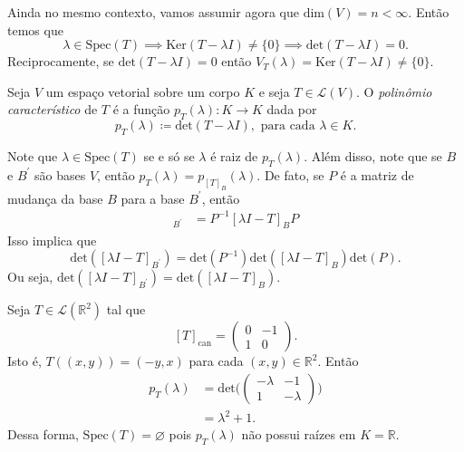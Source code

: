 \documentclass[11pt,twoside,a4paper]{book}
\begin{document}
Ainda no mesmo contexto, vamos assumir agora que \(\text{dim}(V)=n<\infty\). Então temos 
que \[\lambda\in\text{Spec}(T)\implies\text{Ker}(T-\lambda I)\not =\{0\}\implies\text{det}(T-\lambda I)=0.\]
Reciprocamente, se \(\text{det}(T-\lambda I)=0\) então \(V_T(\lambda)=\text{Ker}(T-\lambda I)\not=\{0\}\).
\begin{definicao}
Seja \(V\) um espaço vetorial sobre um corpo \(K\) e seja \(T\in\mathcal{L}(V)\). O \emph{ polinômio característico} de \(T\) é a função \(p_T(\lambda)\colon K\to K\) dada por
\[p_T(\lambda)\coloneqq\text{det}(T-\lambda I), \text{ para cada }\lambda\in K.\]
\end{definicao}
Note que \(\lambda\in\text{Spec}(T)\) se e só se \(\lambda\) é raiz de \(p_T(\lambda)\). Além disso, note que se  \(B\) e \(B^\prime\) são bases \(V\), então \(p_T(\lambda)=p_{[T]_B}(\lambda)\). De fato, se \(P\) é a matriz de mudança da base \(B\) para a base \(B^\prime\), então
\begin{align*}
    [\lambda I - T]_{B^\prime}&=P^{-1}[\lambda I - T]_{B}P
\end{align*}
Isso implica que \[\text{det}([\lambda I- T]_{B^\prime})=\text{det}(P^{-1})\text{det}([\lambda I - T]_B)\text{det}(P).\]
Ou seja, \(\text{det}([\lambda I- T]_{B^\prime})=\text{det}([\lambda I - T]_B)\).
\begin{exemplo}
Seja \(T\in\mathcal{L}(\mathbb{R}^2)\) tal que \[[T]_{\text{can}}=\begin{pmatrix}
0 & -1\\1 & 0
\end{pmatrix}.\]
Isto é, \(T((x,y))=(-y,x)\) para cada \((x,y)\in\mathbb{R}^2\). Então 
\begin{align*}
p_T(\lambda)&=\text{det}\Bigg(\begin{pmatrix}
-\lambda & -1\\1 & -\lambda
\end{pmatrix}\Bigg)\\&=\lambda^2+1.
\end{align*}
Dessa forma, \(\text{Spec}(T)=\varnothing\) pois \(p_T(\lambda)\) não possui raízes em \(K=\mathbb{R}\).
\end{exemplo}
\end{document}
